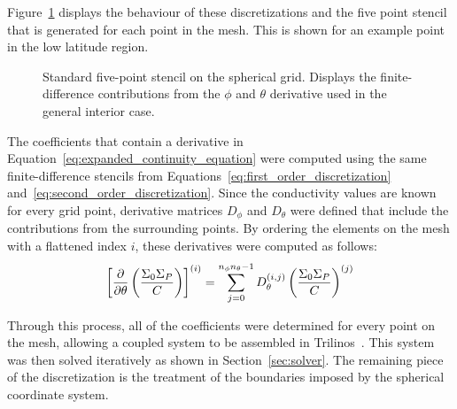 Figure~\ref{diag:std_five_point} displays the behaviour of these  discretizations and the five point stencil that is generated for each point in the mesh. This is shown for an example point in the low latitude region.
\begin{figure}[htbp]
	\centering
	
	\caption{Standard five-point stencil on the spherical grid. Displays the finite-difference contributions from the $\phi$ and $\theta$ derivative used in the general interior case.}
	\label{diag:std_five_point}
\end{figure}

The coefficients that contain a derivative in Equation~\ref{eq:expanded_continuity_equation} were computed using the same finite-difference stencils from Equations~\ref{eq:first_order_discretization} and~\ref{eq:second_order_discretization}. Since the conductivity values are known for every grid point, derivative matrices $D_\phi$ and $D_\theta$ were defined that include the contributions from the surrounding points. By ordering the elements on the mesh with a flattened index $i$, these derivatives were computed as follows:
\begin{align*}
	\left[\pdv{}{\theta} \left(\frac{\Sigma_0\Sigma_P}{C}\right)\right]^{(i)} = \sum_{j=0}^{n_{\phi}n_{\theta}-1} D_\theta^{(i,j)} \left(\frac{\Sigma_0\Sigma_P}{C}\right)^{(j)}
\end{align*}

Through this process, all of the coefficients were determined for every point on the mesh, allowing a coupled system to be assembled in Trilinos~\citep{TrilinosPaper}. This system was then solved iteratively as shown in Section~\ref{sec:solver}. The remaining piece of the discretization is the treatment of the boundaries imposed by the spherical coordinate system.

